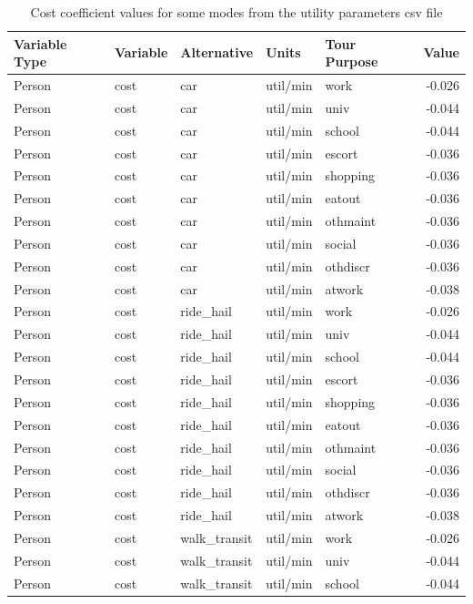 \documentclass[3p, authoryear, review]{elsarticle} %
\begin{document}
\begin{table}

\caption{\label{tab:asimvals}Cost coefficient values for some modes from the utility parameters csv file}
\centering
\begin{tabular}[t]{lllllr}
\toprule
Variable Type & Variable & Alternative & Units & Tour Purpose & Value\\
\midrule
Person & cost & car & util/min & work & -0.026\\
Person & cost & car & util/min & univ & -0.044\\
Person & cost & car & util/min & school & -0.044\\
Person & cost & car & util/min & escort & -0.036\\
Person & cost & car & util/min & shopping & -0.036\\
\addlinespace
Person & cost & car & util/min & eatout & -0.036\\
Person & cost & car & util/min & othmaint & -0.036\\
Person & cost & car & util/min & social & -0.036\\
Person & cost & car & util/min & othdiscr & -0.036\\
Person & cost & car & util/min & atwork & -0.038\\
\addlinespace
Person & cost & ride\_hail & util/min & work & -0.026\\
Person & cost & ride\_hail & util/min & univ & -0.044\\
Person & cost & ride\_hail & util/min & school & -0.044\\
Person & cost & ride\_hail & util/min & escort & -0.036\\
Person & cost & ride\_hail & util/min & shopping & -0.036\\
\addlinespace
Person & cost & ride\_hail & util/min & eatout & -0.036\\
Person & cost & ride\_hail & util/min & othmaint & -0.036\\
Person & cost & ride\_hail & util/min & social & -0.036\\
Person & cost & ride\_hail & util/min & othdiscr & -0.036\\
Person & cost & ride\_hail & util/min & atwork & -0.038\\
\addlinespace
Person & cost & walk\_transit & util/min & work & -0.026\\
Person & cost & walk\_transit & util/min & univ & -0.044\\
Person & cost & walk\_transit & util/min & school & -0.044\\

\end{tabular}
\end{table}
\end{document}
